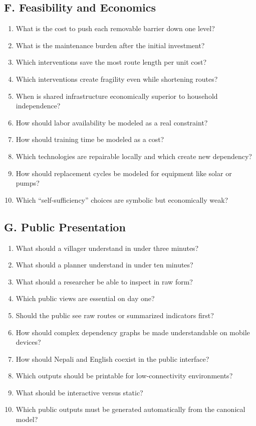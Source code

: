 \documentclass[11pt,a4paper]{article}
\begin{document}
\subsection{F. Feasibility and Economics}
\begin{enumerate}
    \item What is the cost to push each removable barrier down one level?
    \item What is the maintenance burden after the initial investment?
    \item Which interventions save the most route length per unit cost?
    \item Which interventions create fragility even while shortening routes?
    \item When is shared infrastructure economically superior to household independence?
    \item How should labor availability be modeled as a real constraint?
    \item How should training time be modeled as a cost?
    \item Which technologies are repairable locally and which create new dependency?
    \item How should replacement cycles be modeled for equipment like solar or pumps?
    \item Which ``self-sufficiency'' choices are symbolic but economically weak?
\end{enumerate}

\subsection{G. Public Presentation}
\begin{enumerate}
    \item What should a villager understand in under three minutes?
    \item What should a planner understand in under ten minutes?
    \item What should a researcher be able to inspect in raw form?
    \item Which public views are essential on day one?
    \item Should the public see raw routes or summarized indicators first?
    \item How should complex dependency graphs be made understandable on mobile devices?
    \item How should Nepali and English coexist in the public interface?
    \item Which outputs should be printable for low-connectivity environments?
    \item What should be interactive versus static?
    \item Which public outputs must be generated automatically from the canonical model?
\end{enumerate}
\end{document}
